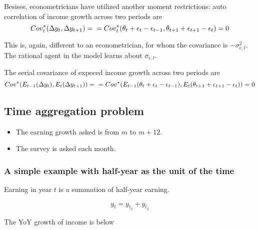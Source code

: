 \documentclass[12pt,notitlepage,onecolumn,aps,pra]{article}
\providecommand{\tightlist}{%
      \setlength{\itemsep}{0pt}\setlength{\parskip}{0pt}}
\begin{document}
Besises, econometricians have utilized another moment restrictions: auto
correlation of income growth across two periods are \begin{equation}
Cov^*_{t}( \Delta y_t, \Delta y_{t+1} ) = \\
 = Cov^*_{t}(\theta_t + \epsilon_t - \epsilon_{t-1}, \theta_{t+1} + \epsilon_{t+1} - \epsilon_{t}) \\
 = 0 
\end{equation}

This is, again, different to an econometrician, for whom the covariance
is \(-\sigma^2_{\epsilon,t}\). The rational agent in the model learns
about \(\sigma_{\epsilon,t}\).

The serial covariance of expeced income growth across two periods are
\begin{equation}
Cov^*( E_{t-1}(\Delta y_t), E_t(\Delta y_{t+1}) ) = \\
= Cov^*(E_{t-1}(\theta_t +\epsilon_t - \epsilon_{t-1}), E_{t}(\theta_{t+1} + \epsilon_{t+1} - \epsilon_t)) \\
= 0
\end{equation}

    \hypertarget{time-aggregation-problem}{%
\subsection{Time aggregation problem}\label{time-aggregation-problem}}

\begin{itemize}
\tightlist
\item
  The earning growth asked is from \(m\) to \(m+12\).
\item
  The survey is asked each month.
\end{itemize}

    \hypertarget{a-simple-example-with-half-year-as-the-unit-of-the-time}{%
\subsubsection{A simple example with half-year as the unit of the
time}\label{a-simple-example-with-half-year-as-the-unit-of-the-time}}

Earning in year \(t\) is a summation of half-year earning.

\begin{equation}
y_t = y_{t_2}+ y_{t_2} 
\end{equation}

The YoY growth of income is below
\end{document}
